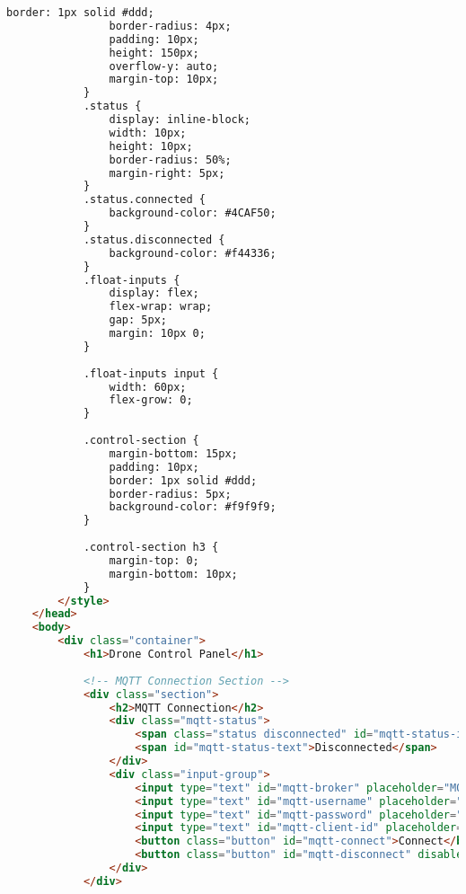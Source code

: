 \begin{lstlisting}[language=html]
                border: 1px solid #ddd;
                border-radius: 4px;
                padding: 10px;
                height: 150px;
                overflow-y: auto;
                margin-top: 10px;
            }
            .status {
                display: inline-block;
                width: 10px;
                height: 10px;
                border-radius: 50%;
                margin-right: 5px;
            }
            .status.connected {
                background-color: #4CAF50;
            }
            .status.disconnected {
                background-color: #f44336;
            }
            .float-inputs {
                display: flex;
                flex-wrap: wrap;
                gap: 5px;
                margin: 10px 0;
            }
            
            .float-inputs input {
                width: 60px;
                flex-grow: 0;
            }
            
            .control-section {
                margin-bottom: 15px;
                padding: 10px;
                border: 1px solid #ddd;
                border-radius: 5px;
                background-color: #f9f9f9;
            }
            
            .control-section h3 {
                margin-top: 0;
                margin-bottom: 10px;
            }
        </style>
    </head>
    <body>
        <div class="container">
            <h1>Drone Control Panel</h1>
            
            <!-- MQTT Connection Section -->
            <div class="section">
                <h2>MQTT Connection</h2>
                <div class="mqtt-status">
                    <span class="status disconnected" id="mqtt-status-indicator"></span>
                    <span id="mqtt-status-text">Disconnected</span>
                </div>
                <div class="input-group">
                    <input type="text" id="mqtt-broker" placeholder="MQTT Broker URL (ws://broker.example.com:8083/mqtt)" value="ws://broker.emqx.io:8083/mqtt">
                    <input type="text" id="mqtt-username" placeholder="Username (optional)">
                    <input type="text" id="mqtt-password" placeholder="Password (optional)" type="password">
                    <input type="text" id="mqtt-client-id" placeholder="Client ID" value="drone_control_panel_">
                    <button class="button" id="mqtt-connect">Connect</button>
                    <button class="button" id="mqtt-disconnect" disabled>Disconnect</button>
                </div>
            </div>
    

\end{lstlisting}
